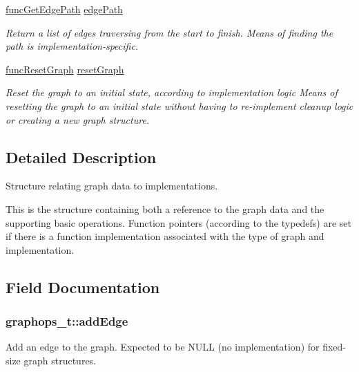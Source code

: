\begin{DoxyCompactItemize}
\hyperlink{graphops_8h_a03b36c65e027cd66fadeb70703a50a2e}{func\+Get\+Edge\+Path} \hyperlink{structgraphops__t_ab0fdace070db2a1fa199e920b6136a04}{edge\+Path}
\begin{DoxyCompactList}\small\item\em Return a list of edges traversing from the start to finish. Means of finding the path is implementation-\/specific. \end{DoxyCompactList}\item 
\hyperlink{graphops_8h_afbe0356f92d2a45740225f068371f4bc}{func\+Reset\+Graph} \hyperlink{structgraphops__t_a5e4e69eeeb8e25607c3af5dfcdbb88aa}{reset\+Graph}
\begin{DoxyCompactList}\small\item\em Reset the graph to an initial state, according to implementation logic Means of resetting the graph to an initial state without having to re-\/implement cleanup logic or creating a new graph structure. \end{DoxyCompactList}\end{DoxyCompactItemize}


\subsection{Detailed Description}
Structure relating graph data to implementations. 

This is the structure containing both a reference to the graph data and the supporting basic operations. Function pointers (according to the typedefs) are set if there is a function implementation associated with the type of graph and implementation. 

\subsection{Field Documentation}
\subsubsection[{\texorpdfstring{add\+Edge}{addEdge}}]{ graphops\+\_\+t\+::add\+Edge}\hypertarget{structgraphops__t_af9a74b6643b49f7799dfa78f4824aa22}{}\label{structgraphops__t_af9a74b6643b49f7799dfa78f4824aa22}


Add an edge to the graph. Expected to be N\+U\+LL (no implementation) for fixed-\/size graph structures. 


